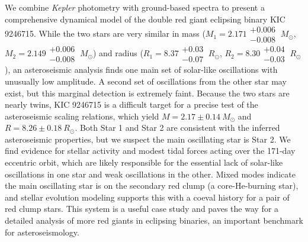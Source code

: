 We combine \emph{Kepler} photometry with ground-based spectra to present a comprehensive dynamical model of the double red giant eclipsing binary KIC 9246715. While the two stars are very similar in mass ($M_1 = 2.171\substack{+0.006 \\ -0.008} \ M_{\odot}$, $M_2 = 2.149\substack{+0.006 \\ -0.008} \ M_{\odot}$) and radius ($R_1 = 8.37\substack{+0.03 \\ -0.07} \ R_{\odot}$, $R_2 = 8.30\substack{+0.04 \\ -0.03} \ R_{\odot}$), an asteroseismic analysis finds one main set of solar-like oscillations with unusually low amplitude. A second set of oscillations from the other star may exist, but this marginal detection is extremely faint. Because the two stars are nearly twins, KIC 9246715 is a difficult target for a precise test of the asteroseismic scaling relations, which yield $M = 2.17\pm0.14 \ M_{\odot}$ and $R = 8.26\pm0.18 \ R_{\odot}$. Both Star 1 and Star 2 are consistent with the inferred asteroseismic properties, but we suspect the main oscillating star is Star 2. We find evidence for stellar activity and modest tidal forces acting over the 171-day eccentric orbit, which are likely responsible for the essential lack of solar-like oscillations in one star and weak oscillations in the other. Mixed modes indicate the main oscillating star is on the secondary red clump (a core-He-burning star), and stellar evolution modeling supports this with a coeval history for a pair of red clump stars. This system is a useful case study and paves the way for a detailed analysis of more red giants in eclipsing binaries, an important benchmark for asteroseismology.
  